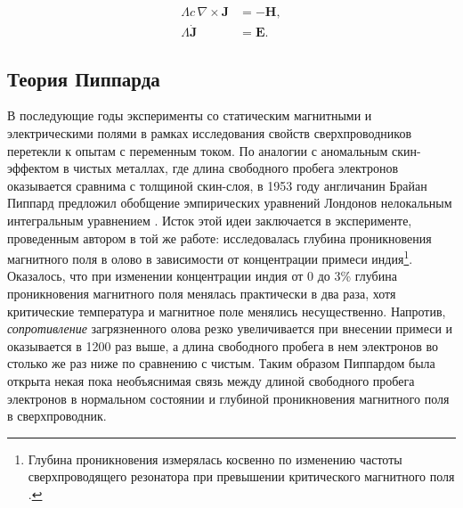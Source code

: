 \documentclass[14pt, a4paper]{extreport}
\numberwithin{equation}{section}
\begin{document}
\begin{align}
\Lambda c\, \nabla \times \mathbf J &= - \mathbf H,\\
\Lambda \dot{\mathbf J} &= \mathbf E.
\end{align}

\subsection{Теория Пиппарда}

В последующие годы эксперименты со статическим магнитными и электрическими полями в рамках исследования свойств сверхпроводников перетекли к опытам с переменным током. По аналогии с аномальным скин-эффектом в чистых металлах, где длина свободного пробега электронов оказывается сравнима с толщиной скин-слоя, в 1953 году англичанин Брайан Пиппард предложил обобщение эмпирических уравнений Лондонов нелокальным интегральным уравнением \cite{pippard1953experimental}. Исток этой идеи заключается в эксперименте, проведенным автором в той же работе: исследовалась глубина проникновения магнитного поля в олово в зависимости от концентрации примеси индия\footnote{Глубина проникновения измерялась косвенно по изменению частоты сверхпроводящего резонатора при превышении критического магнитного поля \cite{pippard1950surface}.}. Оказалось, что при изменении концентрации индия от 0  до 3\% глубина проникновения магнитного поля менялась практически в два раза, хотя критические температура и магнитное поле менялись несущественно. Напротив, \textit{сопротивление} загрязненного олова резко увеличивается при внесении примеси и оказывается в 1200 раз выше, а длина свободного пробега в нем электронов во столько же раз ниже по сравнению с чистым. Таким образом Пиппардом была открыта некая пока необъяснимая связь между длиной свободного пробега электронов в нормальном состоянии и глубиной проникновения магнитного поля в сверхпроводник.
\end{document}
